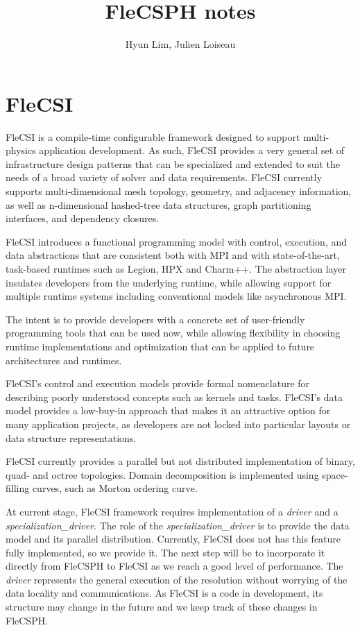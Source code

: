 \documentclass{article}
\begin{document}
\title{FleCSPH notes}

\author{Hyun Lim, Julien Loiseau}

\maketitle

\section{FleCSI}
FleCSI is a compile-time configurable framework designed to support
multi-physics application development.
As such, FleCSI provides a very general set of infrastructure design patterns
that can be specialized and extended to suit the needs of a broad variety of
solver and data requirements.
FleCSI currently supports multi-dimensional mesh topology, geometry, and
adjacency information, as well as n-dimensional hashed-tree data structures,
graph partitioning interfaces, and dependency closures.

FleCSI introduces a functional programming model with control, execution, and
data abstractions that are consistent both with MPI and with state-of-the-art,
task-based runtimes such as Legion, HPX and Charm++.
The abstraction layer insulates developers from the underlying runtime, while
allowing support for multiple runtime systems including conventional models
like asynchronous MPI.

The intent is to provide developers with a concrete set of user-friendly
programming tools that can be used now, while allowing flexibility in choosing
runtime implementations and optimization that can be applied to future
architectures and runtimes.

FleCSI's control and execution models provide formal nomenclature for
describing poorly understood concepts such as kernels and tasks.
FleCSI's data model provides a low-buy-in approach that makes it an attractive
option for many application projects, as developers are not locked into
particular layouts or data structure representations.

FleCSI currently provides a parallel but not distributed implementation of
binary, quad- and octree topologies.
Domain decomposition is implemented using space-filling curves, such as Morton
ordering curve.

At current stage, FleCSI framework requires implementation of a \textit{driver} 
and a \textit{specialization\_driver}.
The role of the \textit{specialization\_driver} is to provide the data model
and its parallel distribution.
Currently, FleCSI does not has this feature fully implemented, so we provide it.
The next step will be to incorporate it directly from FleCSPH to FleCSI as we
reach a good level of performance.
The \textit{driver} represents the general execution of the resolution without
worrying of the data locality and communications.
As FleCSI is a code in development, its structure may change in the future and
we keep track of these changes in FleCSPH.
\end{document}
